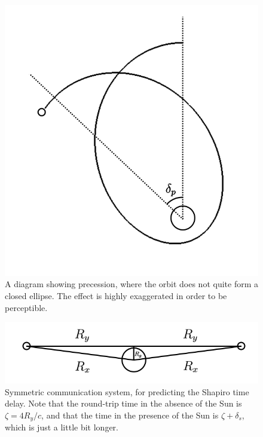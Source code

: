 \documentclass[12pt]{article}
\begin{document}
\begin{figure} 
\centering
\label{fig2}
  \includegraphics[width = 6 in]{precession.png}
  \caption{ A diagram showing precession, where the orbit does not quite form a closed ellipse.
The effect is highly exaggerated in order to be perceptible.
}
\end{figure}



\begin{figure} 
\centering
\label{fig3}
  \includegraphics[width = 6 in]{comm.png}
  \caption{ Symmetric communication system, for predicting the Shapiro time delay.
Note that the round-trip time in the absence of the Sun is $\zeta = 4 R_y / c$, and that the time in the presence of the Sun is $\zeta + \delta_{s}$, which is just a little bit longer.
}
\end{figure}
\end{document}
